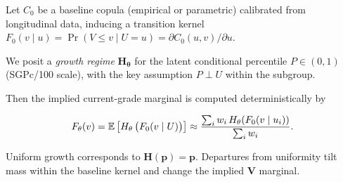 \documentclass[10pt]{article}
\begin{document}
\noindent
\begin{minipage}[t]{3.75in}
  \vspace{0.15in}
  \hspace{0.12in}%
  \begin{minipage}{3.45in}
    \small\raggedright\color{bodyGrey}

    Let $C_0$ be a baseline copula (empirical or parametric) calibrated from 
    longitudinal data, inducing a transition kernel
    $F_0(v\mid u)=\Pr(V\le v\mid U=u)=\partial C_0(u,v)/\partial u$.

    \vspace{4pt}
    We posit a \emph{growth regime} $\symbf{H_\theta}$ for the latent conditional 
    percentile $P\in(0,1)$ (SGPc/100 scale), with the key assumption $P\perp U$ within 
    the subgroup.

    \vspace{4pt}
    Then the implied current-grade marginal is computed deterministically by

    \[
    F_\theta(v)=\mathbb{E}\thinspace\big[H_\theta\thinspace\big(F_0(v\mid U)\big)\big]
    \approx \frac{\sum_i w_i\,H_\theta(F_0(v\mid u_i))}{\sum_i w_i}.
    \]

    \vspace{4pt}
    Uniform growth corresponds to $\symbf{H(p)=p}$. Departures from uniformity 
    tilt mass within the baseline kernel and change the implied $\symbf{V}$ marginal.

  \end{minipage}
  \vspace{0.1in}
\end{minipage}
\end{document}
